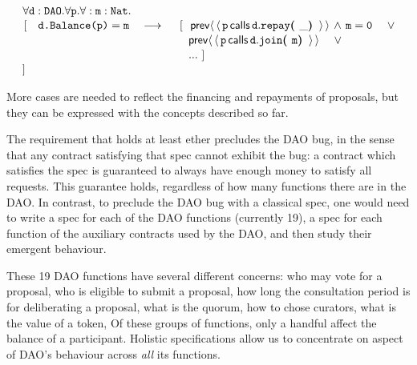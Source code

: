 \noindent
$\strut \hspace{0.5cm} \forall {\mbox{\tt{d}}}:{\mbox{\tt{DAO}}}.\forall {\mbox{\tt{p}}}.\forall:{\mbox{\tt{m}}}:{\mbox{\tt{Nat}}}.$\\
$\strut \hspace{0.5cm} [ \ \ \  \prg{d.Balance(p)}=\prg{m} \ \ \  \longrightarrow   
 \ \  \ \ 
  [ \  \ \Prev{\Calls{\prg{p}}{\prg{repay}}{\prg{d}}{\_}}\, \wedge\, \prg{m}=\prg{0} \ \ \ \ \vee $\\
$\strut \hspace{5.7cm}      
\Prev{\Calls{\prg{p}}{\prg{join}}{\prg{d}}{\prg{m}}}  \ \ \ \ \vee   $\\
 $\strut \hspace{5.7cm}  ... \  ]$ \\
%                         
$\strut \hspace{0.5cm} ] $
  


More cases are needed to reflect the financing and repayments of proposals, but they can be expressed with the concepts described so far.


 

\noindent
The requirement that  holds at least  ether precludes the DAO bug,
in the sense that  any contract satisfying that spec cannot exhibit  the  bug:   a contract
which satisfies the spec  is guaranteed to always have enough money to satisfy all  requests.
This guarantee  holds, regardless of how many functions there are in the DAO.
In contrast, to preclude the DAO  bug with a classical spec, one would need to write a spec for each of the
DAO functions (currently 19), a spec for each function of the auxiliary contracts used by the DAO,
and then study their emergent  behaviour.

These 19 DAO functions   have several different concerns:
who may vote   for a proposal, who is eligible to submit a proposal,
how long the consultation period is for deliberating a proposal, what
is the quorum, how to chose curators, what is the value of a token,
Of these groups of functions, only  a handful affect the balance of a
participant. Holistic specifications allow us to concentrate on aspect of DAO's behaviour across \emph{all} its functions.
 
